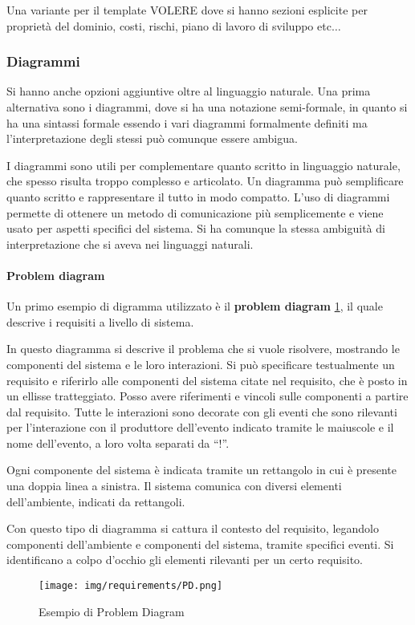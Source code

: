 Una variante per il template VOLERE dove si hanno sezioni esplicite per proprietà del dominio, costi, rischi, piano di lavoro di sviluppo etc$\dots$
\subsubsection{Diagrammi}
Si hanno anche opzioni aggiuntive oltre al linguaggio naturale. Una prima alternativa sono i diagrammi, dove si ha una notazione semi-formale, in quanto si ha una sintassi formale essendo i vari diagrammi formalmente definiti ma l'interpretazione degli stessi può comunque essere ambigua.

I diagrammi sono utili per complementare quanto scritto in linguaggio naturale, che  spesso risulta troppo complesso e articolato. Un diagramma può semplificare quanto scritto e rappresentare il tutto in modo compatto. L'uso di diagrammi permette di ottenere un metodo di comunicazione più semplicemente e viene usato per aspetti specifici del sistema. Si ha comunque la stessa ambiguità di interpretazione che si aveva nei linguaggi naturali. 
\paragraph{Problem diagram}
Un primo esempio di digramma utilizzato è il \textbf{problem diagram} \ref{fig:problemDiagram}, il quale
descrive i requisiti a livello di sistema.

In questo diagramma si descrive il problema che si vuole risolvere, mostrando le
componenti del sistema e le loro interazioni. Si può specificare testualmente un
requisito e riferirlo alle componenti del sistema citate nel requisito, che è
posto in un ellisse tratteggiato. Posso avere riferimenti e vincoli sulle
componenti a partire dal requisito. Tutte le interazioni sono decorate con gli
eventi che sono rilevanti per l'interazione con il produttore dell'evento indicato
tramite le maiuscole e il nome dell'evento, a loro volta separati da “!”.

Ogni componente del sistema è indicata tramite un rettangolo in cui è presente
una doppia linea a sinistra. Il sistema comunica con diversi elementi dell'ambiente,
indicati da rettangoli.

Con questo tipo di diagramma si cattura il contesto del requisito, legandolo
componenti dell'ambiente e componenti del sistema, tramite specifici eventi.
Si identificano a colpo d'occhio gli elementi rilevanti per un certo requisito.
\begin{figure}[!ht]
    \centering
    \texttt{[image: img/requirements/PD.png]}
    \caption{Esempio di Problem Diagram}
    \label{fig:problemDiagram}
\end{figure}

